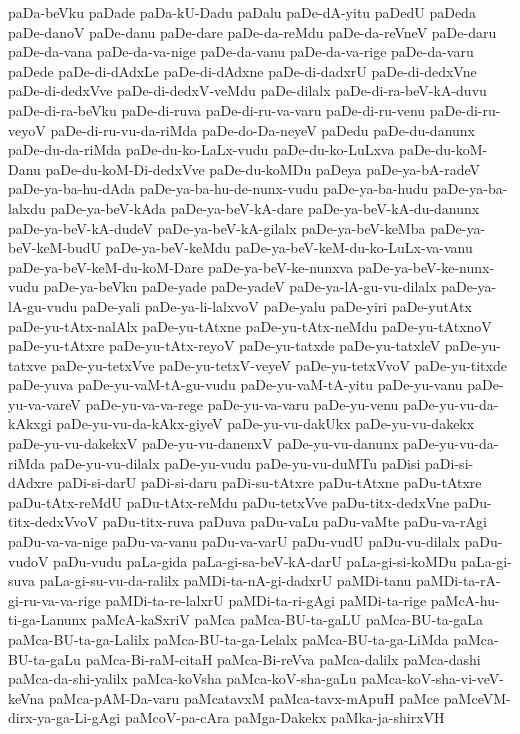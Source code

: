 {paDa-beVku
paDade
paDa-kU-Dadu
paDalu
paDe-dA-yitu
paDedU
paDeda
paDe-danoV
paDe-danu
paDe-dare
paDe-da-reMdu
paDe-da-reVneV
paDe-daru
paDe-da-vana
paDe-da-va-nige
paDe-da-vanu
paDe-da-va-rige
paDe-da-varu
paDede
paDe-di-dAdxLe
paDe-di-dAdxne
paDe-di-dadxrU
paDe-di-dedxVne
paDe-di-dedxVve
paDe-di-dedxV-veMdu
paDe-dilalx
paDe-di-ra-beV-kA-duvu
paDe-di-ra-beVku
paDe-di-ruva
paDe-di-ru-va-varu
paDe-di-ru-venu
paDe-di-ru-veyoV
paDe-di-ru-vu-da-riMda
paDe-do-Da-neyeV
paDedu
paDe-du-danunx
paDe-du-da-riMda
paDe-du-ko-LaLx-vudu
paDe-du-ko-LuLxva
paDe-du-koM-Danu
paDe-du-koM-Di-dedxVve
paDe-du-koMDu
paDeya
paDe-ya-bA-radeV
paDe-ya-ba-hu-dAda
paDe-ya-ba-hu-de-nunx-vudu
paDe-ya-ba-hudu
paDe-ya-ba-lalxdu
paDe-ya-beV-kAda
paDe-ya-beV-kA-dare
paDe-ya-beV-kA-du-danunx
paDe-ya-beV-kA-dudeV
paDe-ya-beV-kA-gilalx
paDe-ya-beV-keMba
paDe-ya-beV-keM-budU
paDe-ya-beV-keMdu
paDe-ya-beV-keM-du-ko-LuLx-va-vanu
paDe-ya-beV-keM-du-koM-Dare
paDe-ya-beV-ke-nunxva
paDe-ya-beV-ke-nunx-vudu
paDe-ya-beVku
paDe-yade
paDe-yadeV
paDe-ya-lA-gu-vu-dilalx
paDe-ya-lA-gu-vudu
paDe-yali
paDe-ya-li-lalxvoV
paDe-yalu
paDe-yiri
paDe-yutAtx
paDe-yu-tAtx-nalAlx
paDe-yu-tAtxne
paDe-yu-tAtx-neMdu
paDe-yu-tAtxnoV
paDe-yu-tAtxre
paDe-yu-tAtx-reyoV
paDe-yu-tatxde
paDe-yu-tatxleV
paDe-yu-tatxve
paDe-yu-tetxVve
paDe-yu-tetxV-veyeV
paDe-yu-tetxVvoV
paDe-yu-titxde
paDe-yuva
paDe-yu-vaM-tA-gu-vudu
paDe-yu-vaM-tA-yitu
paDe-yu-vanu
paDe-yu-va-vareV
paDe-yu-va-va-rege
paDe-yu-va-varu
paDe-yu-venu
paDe-yu-vu-da-kAkxgi
paDe-yu-vu-da-kAkx-giyeV
paDe-yu-vu-dakUkx
paDe-yu-vu-dakekx
paDe-yu-vu-dakekxV
paDe-yu-vu-danenxV
paDe-yu-vu-danunx
paDe-yu-vu-da-riMda
paDe-yu-vu-dilalx
paDe-yu-vudu
paDe-yu-vu-duMTu
paDisi
paDi-si-dAdxre
paDi-si-darU
paDi-si-daru
paDi-su-tAtxre
paDu-tAtxne
paDu-tAtxre
paDu-tAtx-reMdU
paDu-tAtx-reMdu
paDu-tetxVve
paDu-titx-dedxVne
paDu-titx-dedxVvoV
paDu-titx-ruva
paDuva
paDu-vaLu
paDu-vaMte
paDu-va-rAgi
paDu-va-va-nige
paDu-va-vanu
paDu-va-varU
paDu-vudU
paDu-vu-dilalx
paDu-vudoV
paDu-vudu
paLa-gida
paLa-gi-sa-beV-kA-darU
paLa-gi-si-koMDu
paLa-gi-suva
paLa-gi-su-vu-da-ralilx
paMDi-ta-nA-gi-dadxrU
paMDi-tanu
paMDi-ta-rA-gi-ru-va-va-rige
paMDi-ta-re-lalxrU
paMDi-ta-ri-gAgi
paMDi-ta-rige
paMcA-hu-ti-ga-Lanunx
paMcA-kaSxriV
paMca
paMca-BU-ta-gaLU
paMca-BU-ta-gaLa
paMca-BU-ta-ga-Lalilx
paMca-BU-ta-ga-Lelalx
paMca-BU-ta-ga-LiMda
paMca-BU-ta-gaLu
paMca-Bi-raM-citaH
paMca-Bi-reVva
paMca-dalilx
paMca-dashi
paMca-da-shi-yalilx
paMca-koVsha
paMca-koV-sha-gaLu
paMca-koV-sha-vi-veV-keVna
paMca-pAM-Da-varu
paMcatavxM
paMca-tavx-mApuH
paMce
paMceVM-dirx-ya-ga-Li-gAgi
paMcoV-pa-cAra
paMga-Dakekx
paMka-ja-shirxVH‌
}
